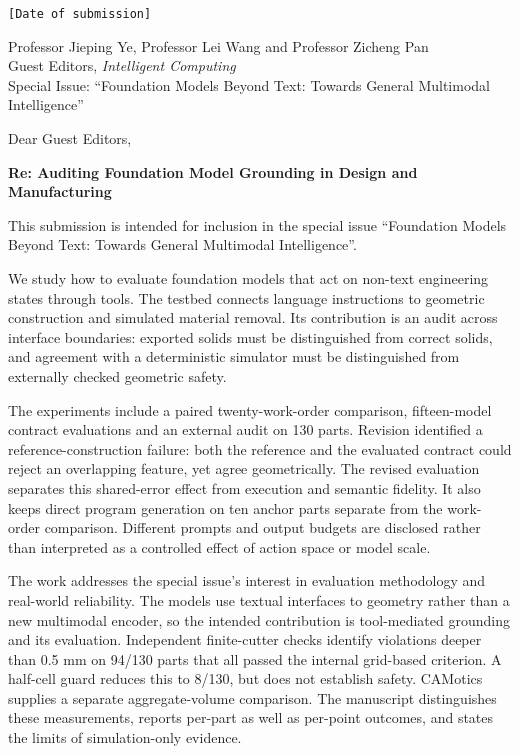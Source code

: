 \documentclass[11pt]{article}
\begin{document}
\begin{flushright}
\texttt{[Date of submission]}
\end{flushright}

\noindent Professor Jieping Ye, Professor Lei Wang and Professor Zicheng Pan\\
Guest Editors, \emph{Intelligent Computing}\\
Special Issue: ``Foundation Models Beyond Text: Towards General Multimodal Intelligence''

\vspace{1.0em}

\noindent Dear Guest Editors,

\vspace{0.5em}

\noindent \textbf{Re: Auditing Foundation Model Grounding in Design and Manufacturing}

\vspace{0.5em}

\noindent This submission is intended for inclusion in the special issue ``Foundation Models Beyond Text: Towards General Multimodal Intelligence''.

\vspace{0.5em}

\noindent We study how to evaluate foundation models that act on non-text engineering states through tools. The testbed connects language instructions to geometric construction and simulated material removal. Its contribution is an audit across interface boundaries: exported solids must be distinguished from correct solids, and agreement with a deterministic simulator must be distinguished from externally checked geometric safety.

\noindent The experiments include a paired twenty-work-order comparison, fifteen-model contract evaluations and an external audit on 130 parts. Revision identified a reference-construction failure: both the reference and the evaluated contract could reject an overlapping feature, yet agree geometrically. The revised evaluation separates this shared-error effect from execution and semantic fidelity. It also keeps direct program generation on ten anchor parts separate from the work-order comparison. Different prompts and output budgets are disclosed rather than interpreted as a controlled effect of action space or model scale.

\noindent The work addresses the special issue's interest in evaluation methodology and real-world reliability. The models use textual interfaces to geometry rather than a new multimodal encoder, so the intended contribution is tool-mediated grounding and its evaluation. Independent finite-cutter checks identify violations deeper than 0.5 mm on 94/130 parts that all passed the internal grid-based criterion. A half-cell guard reduces this to 8/130, but does not establish safety. CAMotics supplies a separate aggregate-volume comparison. The manuscript distinguishes these measurements, reports per-part as well as per-point outcomes, and states the limits of simulation-only evidence.
\end{document}
